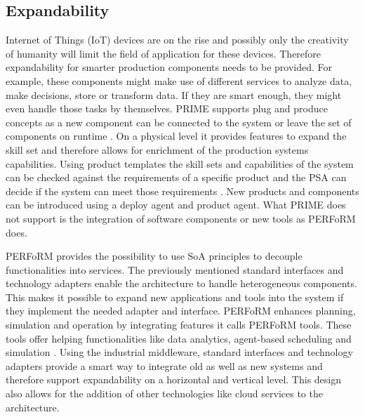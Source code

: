 \documentclass[conference,compsoc,hidelinks]{IEEEtran}
\begin{document}
\subsection{Expandability}
Internet of Things (IoT) devices are on the rise and possibly only the creativity of humanity will limit the field of application for these devices. Therefore expandability for smarter production components needs to be provided. For example, these components might make use of different services to analyze data, make decisions, store or transform data. If they are smart enough, they might even handle those tasks by themselves. PRIME supports plug and produce concepts as a new component can be connected to the system or leave the set of components on runtime \cite{Hybrid}. On a physical level it provides features to expand the skill set and therefore allows for enrichment of the production systems capabilities. Using product templates the skill sets and capabilities of the system can be checked against the requirements of a specific product and the PSA can decide if the system can meet those requirements \cite{Hybrid}. New products and components can be introduced using a deploy agent and product agent. What PRIME does not support is the integration of software components or new tools as PERFoRM does.
 
PERFoRM provides the possibility to use SoA principles to decouple functionalities into services. The previously mentioned standard interfaces and technology adapters enable the architecture to handle heterogeneous components. This makes it possible to expand new applications and tools into the system if they implement the needed adapter and interface. 
PERFoRM enhances planning, simulation and operation by integrating features it calls PERFoRM tools. These tools offer helping functionalities like data analytics, agent-based scheduling and simulation \cite{SpecPERFoRM}.
Using the industrial middleware, standard interfaces and technology adapters provide a smart way to integrate old as well as new systems and therefore support expandability on a horizontal and vertical level. This design also allows for the addition of other technologies like cloud services to the architecture.
\end{document}
